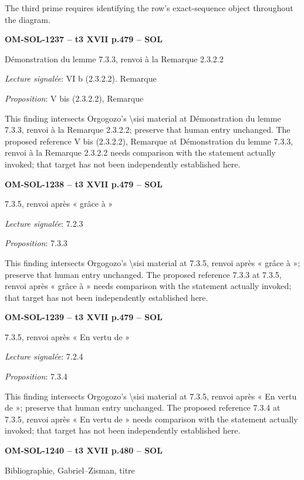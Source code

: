 The third prime requires identifying the row's exact-sequence object throughout the diagram.\par
\par\noindent\textbf{OM-SOL-1237 -- t3 XVII p.479 -- SOL}\par
Démonstration du lemme 7.3.3, renvoi à la Remarque 2.3.2.2\par
\emph{Lecture signalée}: VI b (2.3.2.2). Remarque\par
\emph{Proposition}: V bis (2.3.2.2), Remarque\par
This finding intersects Orgogozo's \textbackslash{}sisi material at Démonstration du lemme 7.3.3, renvoi à la Remarque 2.3.2.2; preserve that human entry unchanged. The proposed reference V bis (2.3.2.2), Remarque at Démonstration du lemme 7.3.3, renvoi à la Remarque 2.3.2.2 needs comparison with the statement actually invoked; that target has not been independently established here.\par
\par\noindent\textbf{OM-SOL-1238 -- t3 XVII p.479 -- SOL}\par
7.3.5, renvoi après « grâce à »\par
\emph{Lecture signalée}: 7.2.3\par
\emph{Proposition}: 7.3.3\par
This finding intersects Orgogozo's \textbackslash{}sisi material at 7.3.5, renvoi après « grâce à »; preserve that human entry unchanged. The proposed reference 7.3.3 at 7.3.5, renvoi après « grâce à » needs comparison with the statement actually invoked; that target has not been independently established here.\par
\par\noindent\textbf{OM-SOL-1239 -- t3 XVII p.479 -- SOL}\par
7.3.5, renvoi après « En vertu de »\par
\emph{Lecture signalée}: 7.2.4\par
\emph{Proposition}: 7.3.4\par
This finding intersects Orgogozo's \textbackslash{}sisi material at 7.3.5, renvoi après « En vertu de »; preserve that human entry unchanged. The proposed reference 7.3.4 at 7.3.5, renvoi après « En vertu de » needs comparison with the statement actually invoked; that target has not been independently established here.\par
\par\noindent\textbf{OM-SOL-1240 -- t3 XVII p.480 -- SOL}\par
Bibliographie, Gabriel–Zisman, titre\par
